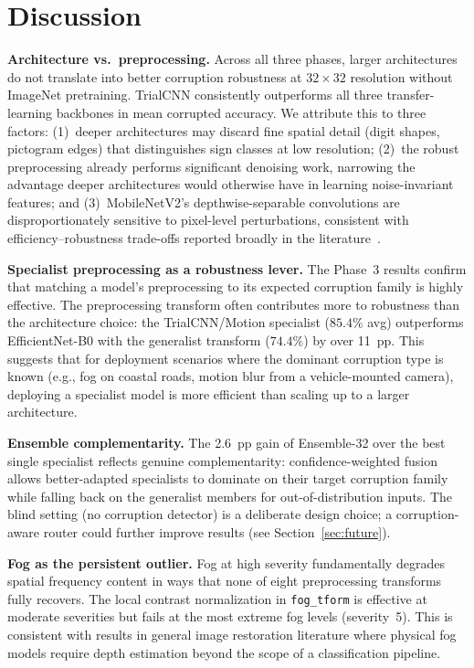 \documentclass[conference]{IEEEtran}
\begin{document}
\section{Discussion}
\label{sec:discussion}

\textbf{Architecture vs.\ preprocessing.} Across all three phases, larger architectures do not translate into better corruption robustness at $32{\times}32$ resolution without ImageNet pretraining. TrialCNN consistently outperforms all three transfer-learning backbones in mean corrupted accuracy. We attribute this to three factors: (1)~deeper architectures may discard fine spatial detail (digit shapes, pictogram edges) that distinguishes sign classes at low resolution; (2)~the robust preprocessing already performs significant denoising work, narrowing the advantage deeper architectures would otherwise have in learning noise-invariant features; and (3)~MobileNetV2's depthwise-separable convolutions are disproportionately sensitive to pixel-level perturbations, consistent with efficiency--robustness trade-offs reported broadly in the literature~\cite{hendrycks2019robustness}.

\textbf{Specialist preprocessing as a robustness lever.} The Phase~3 results confirm that matching a model's preprocessing to its expected corruption family is highly effective. The preprocessing transform often contributes more to robustness than the architecture choice: the TrialCNN/Motion specialist ($85.4\%$ avg) outperforms EfficientNet-B0 with the generalist transform ($74.4\%$) by over 11~pp. This suggests that for deployment scenarios where the dominant corruption type is known (e.g., fog on coastal roads, motion blur from a vehicle-mounted camera), deploying a specialist model is more efficient than scaling up to a larger architecture.

\textbf{Ensemble complementarity.} The 2.6~pp gain of Ensemble-32 over the best single specialist reflects genuine complementarity: confidence-weighted fusion allows better-adapted specialists to dominate on their target corruption family while falling back on the generalist members for out-of-distribution inputs. The blind setting (no corruption detector) is a deliberate design choice; a corruption-aware router could further improve results (see Section~\ref{sec:future}).

\textbf{Fog as the persistent outlier.} Fog at high severity fundamentally degrades spatial frequency content in ways that none of eight preprocessing transforms fully recovers. The local contrast normalization in \texttt{fog\_tform} is effective at moderate severities but fails at the most extreme fog levels (severity~5). This is consistent with results in general image restoration literature where physical fog models require depth estimation beyond the scope of a classification pipeline.
\end{document}
